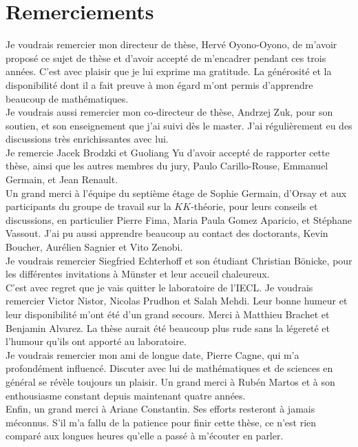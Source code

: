 \section*{Remerciements}

Je voudrais remercier mon directeur de thèse, Hervé Oyono-Oyono, de m'avoir proposé ce sujet de thèse et d'avoir accepté de m'encadrer pendant ces trois années. C'est avec plaisir que je lui exprime ma gratitude. La générosité et la disponibilité dont il a fait preuve à mon égard m'ont permis d'apprendre beaucoup de mathématiques.\\%

Je voudrais aussi remercier mon co-directeur de thèse, Andrzej Zuk, pour son soutien, et son enseignement que j'ai suivi dès le master. J'ai régulièrement eu des discussions très enrichissantes avec lui.\\

Je remercie Jacek Brodzki et Guoliang Yu d'avoir accepté de rapporter cette thèse, ainsi que les autres membres du jury, Paulo Carillo-Rouse, Emmanuel Germain, et Jean Renault.\\   

Un grand merci à l'équipe du septième étage de Sophie Germain, d'Orsay et aux participants du groupe de travail sur la $KK$-théorie, pour leurs conseils et discussions, en particulier Pierre Fima, Maria Paula Gomez Aparicio, et Stéphane Vassout. J'ai pu aussi apprendre beaucoup au contact des doctorants, Kevin Boucher, Aurélien Sagnier et Vito Zenobi. \\

Je voudrais remercier Siegfried Echterhoff et son étudiant Christian Bönicke, pour les différentes invitations à Münster et leur accueil chaleureux.\\

C'est avec regret que je vais quitter le laboratoire de l'IECL. Je voudrais remercier Victor Nistor, Nicolas Prudhon et Salah Mehdi. Leur bonne humeur et leur disponibilité m'ont été d'un grand secours. Merci à Matthieu Brachet et Benjamin Alvarez. La thèse aurait été beaucoup plus rude sans la légereté et l'humour qu'ils ont apporté au laboratoire. \\

Je voudrais remercier mon ami de longue date, Pierre Cagne, qui m'a profondément influencé. Discuter avec lui de mathématiques et de sciences en général se révèle toujours un plaisir. Un grand merci à Rubén Martos et à son enthousiasme constant depuis maintenant quatre années. \\

Enfin, un grand merci à Ariane Constantin. Ses efforts resteront à jamais méconnus. S'il m'a fallu de la patience pour finir cette thèse, ce n'est rien comparé aux longues heures qu'elle a passé à m'écouter en parler.\\   


